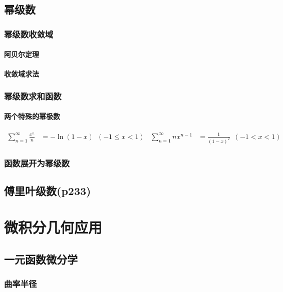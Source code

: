 ﻿\documentclass[a4paper,12pt,UTF8]{ctexart}
\begin{document}
    \subsection{幂级数}

    \subsubsection{幂级数收敛域}

    \paragraph{阿贝尔定理}

    \paragraph{收敛域求法}

    \subsubsection{幂级数求和函数}
    
    \paragraph{两个特殊的幂极数}
    \begin{align*}
        \sum_{n=1}^{\infty}\frac{x^{n}}{n}&=-\ln (1-x) \enspace (-1 \leq  x < 1)&  \sum_{n=1}^{\infty} nx^{n-1}&=\frac{1}{(1-x)^{2}} \enspace (-1 < x < 1)&
    \end{align*}

    \subsubsection{函数展开为幂级数}

    \subsection{傅里叶级数(p233)}

    \section{微积分几何应用}

    \subsection{一元函数微分学}

    \subsubsection{曲率半径}
\end{document}
